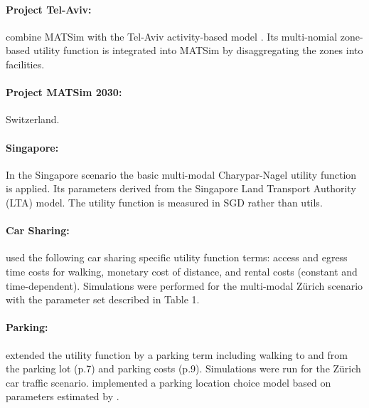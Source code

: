 \paragraph{Project Tel-Aviv:}
\citet[][]{BekhorEtAl_TRB_2011, DoblerEtAl_TechRep_IVT_2014} combine MATSim with the Tel-Aviv activity-based model \citep[][]{CambrigeSystemsInc_ResRep_TelAviv_2008}. Its multi-nomial zone-based utility function is integrated into MATSim by disaggregating the zones into facilities.

\paragraph{Project MATSim 2030:}
Switzerland. 

\paragraph{Singapore:}
In the Singapore scenario \citep[][]{ErathEtAl_IATBR_2012} the basic multi-modal Charypar-Nagel utility function is applied. Its parameters derived from the Singapore Land Transport Authority (LTA) model. The utility function is measured in SGD rather than utils.

\paragraph{Car Sharing:}
\citet[][p.10]{CiariEtAl_TechRep_IVT_2014} used the following car sharing specific utility function terms: access and egress time costs for walking, monetary cost of distance, and rental costs (constant and time-dependent). Simulations were performed for the multi-modal Zürich scenario with the parameter set described in Table 1.

\paragraph{Parking:}
\citet[][]{WaraichAxhausen_TechRep_IVT_2012} extended the utility function by a parking term including walking to and from the parking lot (p.7) and parking costs (p.9). Simulations were run for the Zürich car traffic scenario. \citet{WaraichEtAl_unpub_TRB_2013} implemented a parking location choice model based on parameters estimated by \citet[][]{WeisEtAl_TechRep_TSMS_2013}.

